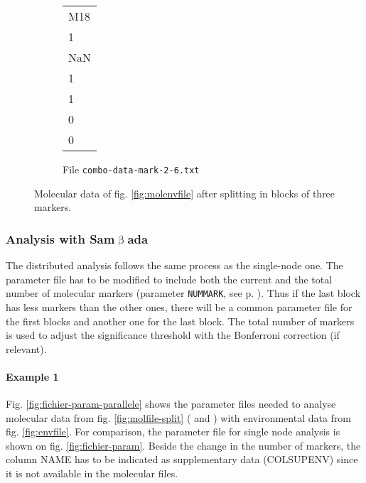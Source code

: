 \documentclass[a4paper,11pt]{article}
\newcommand{\smb}{\textsf{Sam$\upbeta$ada}}
\newcommand{\smbtitre}{\protect\texorpdfstring{\smb}{Samßada}}
\begin{document}
\begin{figure}[htbp]
\begin{minipage}{1.2\textwidth}
\vspace{2mm}	

	\begin{subfigure}[t]{.45\textwidth}
		\begin{mdframed}[backgroundcolor=white,userdefinedwidth=2.2cm,align=center]
		\begin{tabular}{l}
			M18 \\
			1 \\
			NaN \\
			1 \\
			1 \\
			0 \\
			0 \\
		\end{tabular}
		\end{mdframed}
		\parbox[l]{\textwidth}{\caption{File \texttt{combo-data-mark-2-6.txt}\label{fig:combo-split-mol-2}}}
	\end{subfigure}%

	\caption{Molecular data of fig. \ref{fig:molenvfile} after splitting in blocks of three markers.}
	\label{fig:combo-split}
\end{minipage}

\end{figure}




\subsubsection{Analysis with \smbtitre}
The distributed analysis follows the same process as the single-node one.
The parameter file has to be modified to include both the current and the total number of molecular markers (parameter \texttt{NUMMARK}, see p. \pageref{param:nummark}).
Thus if the last block has less markers than the other ones, there will be a common parameter file for the first blocks and another one for the last block.
The total number of markers is used to adjust the significance threshold with the Bonferroni correction (if relevant).

\paragraph{Example 1}
Fig. \ref{fig:fichier-param-parallele} shows the parameter files needed to analyse molecular data from fig. \ref{fig:molfile-split} ( and ) with environmental data from fig. \ref{fig:envfile}.
For comparison, the parameter file for single node analysis is shown on fig. \ref{fig:fichier-param}.
Beside the change in the number of markers, the column NAME has to be indicated as supplementary data (COLSUPENV) since it is not available in the molecular files.
\end{document}
